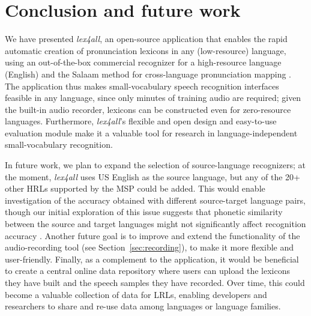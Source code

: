 \documentclass[11pt]{article}
\begin{document}
\section{Conclusion and future work}
\label{sec:future}

We have presented \textit{lex4all}, an open-source application that enables the rapid automatic creation of pronunciation lexicons in any (low-resource) language, using an out-of-the-box commercial recognizer 
for a high-resource language (English) and the Salaam method for cross-language pronunciation mapping \cite{Qiao10,Chan12}. The application thus makes small-vocabulary speech recognition interfaces feasible in any language, since 
only minutes of training audio 
are required; 
given the built-in audio recorder, lexicons can be constructed even for zero-resource languages. 
Furthermore, \textit{lex4all}'s flexible and open design and easy-to-use evaluation module
make it a valuable tool for
research in language-independent small-vocabulary recognition.

In future work, we plan 
to expand the selection of source-language recognizers; at the moment, \textit{lex4all} uses US English as the source language, but any of the 20+ other HRLs supported by the MSP could be added.
This would enable investigation of the accuracy obtained with different source-target language pairs, though our initial exploration of this issue suggests that phonetic similarity between the source and target languages might not significantly affect recognition accuracy \cite{vakil14}. 
Another future goal is to improve and extend the functionality of the audio-recording tool (see Section~\ref{sec:recording}), 
to make it more flexible and user-friendly.
Finally, as a complement to the application, it would be beneficial to 
create a central online data repository where users can 
upload the lexicons they have built and the speech samples they have recorded. %
Over time, this could become a valuable collection of data for LRLs, enabling developers and researchers to share and re-use data among languages or language families.
\end{document}
